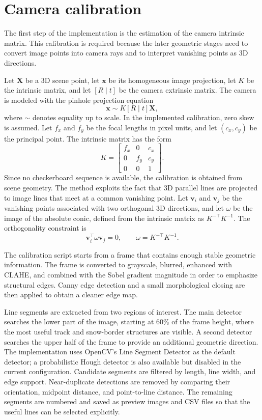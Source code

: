 \section{Camera calibration}
The first step of the implementation is the estimation of the camera intrinsic matrix. This calibration is required because the later geometric stages need to convert image points into camera rays and to interpret vanishing points as 3D directions.

Let \(\mathbf{X}\) be a 3D scene point, let \(\mathbf{x}\) be its homogeneous image projection, let \(K\) be the intrinsic matrix, and let \([R \mid t]\) be the camera extrinsic matrix. The camera is modeled with the pinhole projection equation
\[
\mathbf{x} \sim K [R \mid t] \mathbf{X},
\]
where \(\sim\) denotes equality up to scale. In the implemented calibration, zero skew is assumed. Let \(f_x\) and \(f_y\) be the focal lengths in pixel units, and let \((c_x,c_y)\) be the principal point. The intrinsic matrix has the form
\[
K =
\begin{bmatrix}
f_x & 0 & c_x \\
0 & f_y & c_y \\
0 & 0 & 1
\end{bmatrix}.
\]
Since no checkerboard sequence is available, the calibration is obtained from scene geometry. The method exploits the fact that 3D parallel lines are projected to image lines that meet at a common vanishing point. Let \(\mathbf{v}_i\) and \(\mathbf{v}_j\) be the vanishing points associated with two orthogonal 3D directions, and let \(\omega\) be the image of the absolute conic, defined from the intrinsic matrix as \(K^{-\top}K^{-1}\). The orthogonality constraint is
\[
\mathbf{v}_i^\top \omega \mathbf{v}_j = 0,
\qquad
\omega = K^{-\top}K^{-1}.
\]

The calibration script starts from a frame that contains enough stable geometric information. The frame is converted to grayscale, blurred, enhanced with CLAHE, and combined with the Sobel gradient magnitude in order to emphasize structural edges. Canny edge detection and a small morphological closing are then applied to obtain a cleaner edge map.

Line segments are extracted from two regions of interest. The main detector searches the lower part of the image, starting at 60\% of the frame height, where the most useful track and snow-border structures are visible. A second detector searches the upper half of the frame to provide an additional geometric direction. The implementation uses OpenCV's Line Segment Detector as the default detector; a probabilistic Hough detector is also available but disabled in the current configuration. Candidate segments are filtered by length, line width, and edge support. Near-duplicate detections are removed by comparing their orientation, midpoint distance, and point-to-line distance. The remaining segments are numbered and saved as preview images and CSV files so that the useful lines can be selected explicitly.


